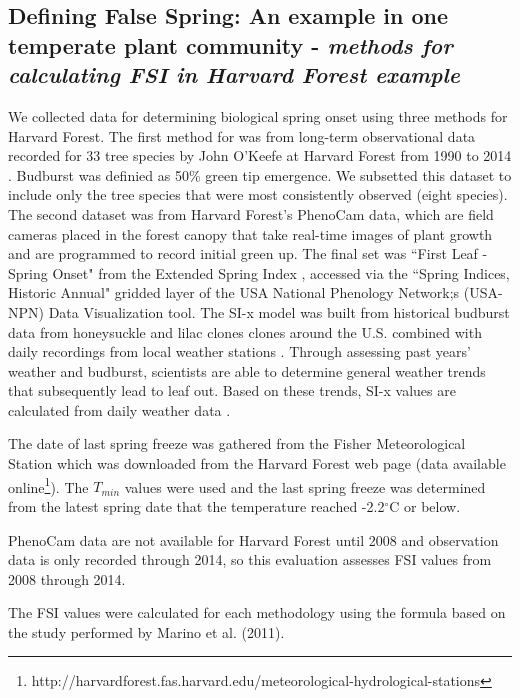 \documentclass{article}\usepackage[]{graphicx}\usepackage[]{color}
\begin{document}
\subsection*{Defining False Spring: An example in one temperate plant community - \textit{methods for calculating FSI in Harvard Forest example}}
We collected data for determining biological spring onset using three methods for Harvard Forest. The first method for was from long-term observational data recorded for 33 tree species by John O'Keefe at Harvard Forest from 1990 to 2014 \citep{OKeefe2014}. Budburst was definied as 50\% green tip emergence. We subsetted this dataset to include only the tree species that were most consistently observed (eight species). The second dataset was from Harvard Forest's PhenoCam data, which are field cameras placed in the forest canopy that take real-time images of plant growth and are programmed to record initial green up. The final set was ``First Leaf - Spring Onset"  from the Extended Spring Index \citep[SI-X,][]{SI-x2016}, accessed via the ``Spring Indices, Historic Annual" gridded layer of the USA National Phenology Network;s (USA-NPN) Data Visualization tool. The SI-x model was built from historical budburst data from honeysuckle and lilac clones clones around the U.S. combined with daily recordings from local weather stations \citep{USA-NPN2016, Ault2015, Ault2015a, Schwartz2013, Schwartz1997}. Through assessing past years' weather and budburst, scientists are able to determine general weather trends that subsequently lead to leaf out. Based on these trends, SI-x values are calculated from daily weather data \citep{USA-NPN2016}.
\par
The date of last spring freeze was gathered from the Fisher Meteorological Station which was downloaded from the Harvard Forest web page (data available online\footnote{http://harvardforest.fas.harvard.edu/meteorological-hydrological-stations}). The $T_{min}$ values were used and the last spring freeze was determined from the latest spring date that the temperature reached -2.2$^{\circ}$C or below. 
\par
PhenoCam data are not available for Harvard Forest until 2008 and observation data is only recorded through 2014, so this evaluation assesses FSI values from 2008 through 2014.
\par The FSI values were calculated for each methodology using the formula based on the study performed by Marino et al. (2011).  
\end{document}
